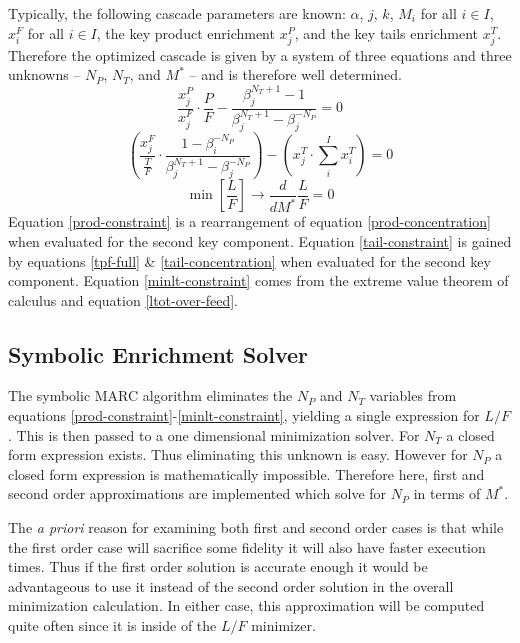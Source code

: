 \documentclass{ansconf}
\begin{document}
Typically, the following cascade parameters are known:
$\alpha$, 
$j$, $k$, 
$M_i$ for all $i\in I$, 
$x_i^F$ for all $i\in I$, 
the key product enrichment $x_j^P$, and the key 
tails enrichment $x_j^T$.  Therefore the optimized cascade is given by 
a system of three equations and three unknowns --
$N_P$, $N_T$, and $M^*$ -- and is therefore well determined.
\begin{equation}
\frac{x_j^P}{x_j^F}\cdot\frac{P}{F} - \frac{\beta_j^{N_T+1} - 1}
                                           {\beta_j^{N_T+1} - \beta_j^{-N_P}} = 0
\label{prod-constraint}
\end{equation}
\begin{equation}
\left(\frac{x_j^F}{\frac{T}{F}} \cdot \frac{1 - \beta_i^{-N_P}}
                                           {\beta_j^{N_T+1} - \beta_j^{-N_P}} \right)
- \left(x_j^T\cdot\sum_i^{I} x_i^T\right) = 0
\label{tail-constraint}
\end{equation}
\begin{equation}
\min\left[\frac{L}{F}\right]\to \frac{d}{dM^*} \frac{L}{F} = 0
\label{minlt-constraint}
\end{equation}
Equation \ref{prod-constraint} is a rearrangement of equation \ref{prod-concentration}
when evaluated for the second key component.
Equation \ref{tail-constraint} is gained by equations \ref{tpf-full} \&
\ref{tail-concentration} when evaluated for the second key component.
Equation \ref{minlt-constraint} comes from the extreme value theorem of calculus
and equation \ref{ltot-over-feed}.

\subsection{Symbolic Enrichment Solver}
\label{sec:symes}

The symbolic MARC algorithm \cite{Scopatz2012} eliminates the $N_P$ and $N_T$ 
variables from equations \ref{prod-constraint}-\ref{minlt-constraint}, yielding a 
single expression for $L/F$.  This is then passed to a one dimensional minimization 
solver.  For $N_T$ a closed form expression exists.  Thus eliminating this unknown 
is easy.  However for $N_P$ a closed form expression is mathematically impossible.  
Therefore here, first and second order approximations are implemented which solve for
$N_P$ in terms of $M^*$.  

The \emph{a priori} reason for examining both first and second order cases is that 
while the first order case will sacrifice some fidelity it will also have faster 
execution times.  Thus if the first order solution is accurate enough it would be 
advantageous to use it instead of the second order solution in the overall 
minimization calculation.  In either case, this approximation will be computed quite
often since it is inside of the $L/F$ minimizer.
\end{document}
